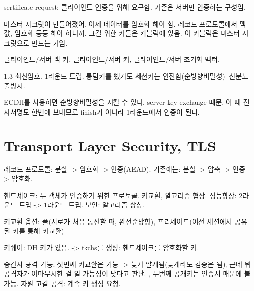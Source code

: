 sertificate request: 클라이언트 인증을 위해 요구함. 기존은 서버만 인증하는 구성임.

마스터 시크릿이 만들어졌어. 이제 데이터를 암호화 해야 함. 레코드 프로토콜에서 맥값, 암호화 등등 해야 하니까.
그걸 위한 키들은 키블럭에 있음. 이 키블럭은 마스터 시크릿으로 만드는 거임.

클라이언트/서버 맥 키,  클라이언트/서버 키, 클라이언트/서버 초기화 벡터.

1.3
최신암호. 1라운드 트립. 롱텀키를 뺐겨도 세션키는 안전함(순방향비밀성). 신분노출방지.

ECDH를 사용하면 순방향비밀성을 지킬 수 있다. server key exchange 때문. 이 때 전자서명도 한번에 보내므로
finish가 아니라 1라운드에서 인증이 된다.

\newpage
\section{Transport Layer Security, TLS}

레코드 프로토콜: 분할 -> 암호화 -> 인증(AEAD).
기존에는: 분할 -> 압축 -> 인증 -> 암호화.

핸드셰이크: 두 객체가 인증하기 위한 프로토콜. 키교환, 알고리즘 협상.
성능향상: 2라운드 트립 -> 1라운드 트립.
보안: 알고리즘 향상. 

키교환 옵션: 
  풀(서로가 처음 통신할 때, 완전순방향), 
  프리셰어드(이전 세션에서 공유된 키를 통해 키교환)


키쉐어: DH 키가 있음. -> tkchs를 생성: 핸드셰이크를 암호화할 키.
   
중간자 공격 가능: 첫번째 키교환은 가능 -> 늦게 알게됨(늦게라도 검증은 됨), 근데 뭐 공격자가 어마무시한 걸 알 가능성이 낮다고 판단.
, 두번째 공개키는 인증서 때문에 불가능.
자원 고갈 공격: 계속 키 생성 요청.

